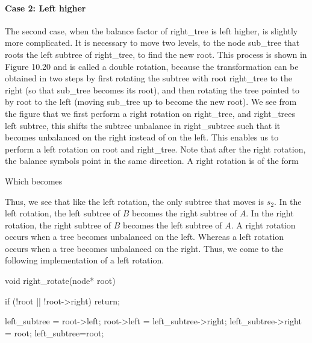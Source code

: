 \documentclass{report}
\begin{document}
\pagebreak 
\paragraph{Case 2: Left higher}
\bigbreak \noindent \bigbreak \noindent 
The second case, when the balance factor of right\_tree is left higher, is slightly more complicated. It is necessary to move two levels, to the node sub\_tree that roots the left subtree of right\_tree, to find the new root. This process is shown in Figure 10.20 and is called a double rotation, because the transformation can be obtained in two steps by first rotating the subtree with root right\_tree to the right (so that sub\_tree becomes its root), and then rotating the tree pointed to by root to the left (moving sub\_tree up to become the new root).
\bigbreak \noindent 
{}
\bigbreak \noindent 
We see from the figure that we first perform a right rotation on right\_tree, and right\_trees left subtree, this shifts the subtree unbalance in right\_subtree such that it becomes unbalanced on the right instead of on the left. This enables us to perform a left rotation on root and right\_tree. Note that after the right rotation, the balance symbols point in the same direction. A right rotation is of the form
\bigbreak \noindent 
\begin{figure}[ht]
    \centering
    \label{fig:t4}
\end{figure}
\pagebreak \bigbreak \noindent 
Which becomes
\begin{figure}[ht]
    \centering
    \label{fig:t5}
\end{figure}
\bigbreak \noindent 
Thus, we see that like the left rotation, the only subtree that moves is $s_{2}$. In the left rotation, the left subtree of $B$ becomes the right subtree of $A$. In the right rotation, the right subtree of $B$ becomes the left subtree of $A$. A right rotation occurs when a tree becomes unbalanced on the left. Whereas a left rotation occurs when a tree becomes unbalanced on the right.
\bigbreak \noindent 
Thus, we come to the following implementation of a left rotation.
\bigbreak \noindent 
\begin{cppcode}
    void right_rotate(node* root) {
        if (!root || !root->right) return;
        
        left_subtree = root->left;
        root->left = left_subtree->right;
        left_subtree->right = root;
        left_subtree=root;
    }
\end{cppcode}
\end{document}
